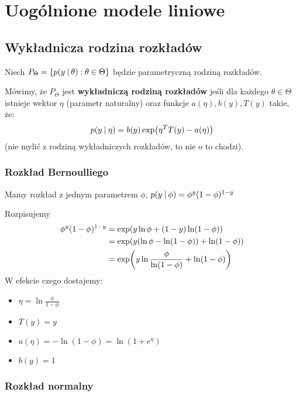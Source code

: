 \section{Uogólnione modele liniowe}

\subsection{Wykładnicza rodzina rozkładów}

\begin{definition}
Niech \( P_\Theta = \set{p(y \given \theta) : \theta \in \Theta} \) będzie parametryczną rodziną rozkładów.

Mówimy, że \( P_\Theta \) jest \textbf{wykładniczą rodziną rozkładów} jeśli dla każdego \( \theta \in \Theta \) istnieje wektor \( \eta \) (parametr naturalny) oraz funkcje \( a(\eta), b(y), T(y) \) takie, że:
\[
    p(y \given \eta) = b(y)\exp\pars{\eta^T T(y) - a(\eta)}
\]
(nie mylić z rodziną wykładniczych rozkładów, to nie o to chodzi).
\end{definition}

\subsubsection{Rozkład Bernoulliego}

Mamy rozkład z jednym parametrem \( \phi \), \( p(y \:\vert\: \phi) = \phi^y(1-\phi)^{1-y} \)

Rozpisujemy 
\begin{align*}
    \phi^y(1-\phi)^{1-y} 
    &= \exp\pars{y \ln \phi + (1 - y) \ln (1 - \phi)} \\
    &= \exp\pars{y (\ln \phi - \ln (1 - \phi)) + \ln (1 - \phi)} \\
    &= \exp\pars{y \ln \frac{\phi}{\ln (1 - \phi)} + \ln (1 - \phi)} \\
\end{align*}
W efekcie czego dostajemy:
\begin{itemize}
    \item \( \eta = \ln \frac{\phi}{1 - \phi} \)
    \item \( T(y) = y \)
    \item \( a(\eta) = -\ln(1 - \phi) = \ln(1 + e^\eta) \)
    \item \( b(y) = 1 \)
\end{itemize}

\subsubsection{Rozkład normalny}


